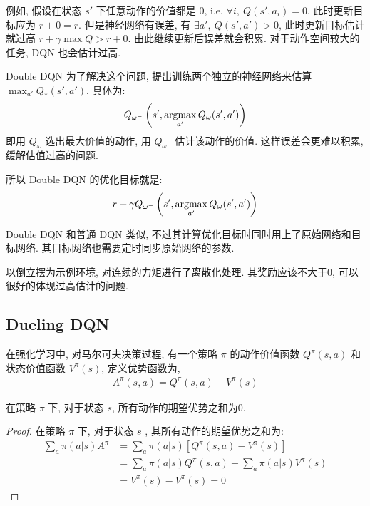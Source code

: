 例如, 假设在状态 $s'$ 下任意动作的价值都是 0, i.e.  $\forall i,\ Q(s', a_i)=0$, 此时更新目标应为 $r+0=r$. 但是神经网络有误差, 有 $\exists a',\ Q(s',a')>0$, 此时更新目标估计就过高 $r+\gamma \max Q > r+0$. 由此继续更新后误差就会积累. 对于动作空间较大的任务, DQN 也会估计过高. 

Double DQN 为了解决这个问题, 提出训练两个独立的神经网络来估算 $\max_{a'}Q_*(s',a')$. 具体为:
\begin{align*}
    Q_{\omega^-}\left( s', \operatorname*{argmax}_{a'} Q_{\omega} (s', a') \right)
\end{align*}
即用 $Q_{\omega}$ 选出最大价值的动作, 用 $ Q_{\omega^-}$ 估计该动作的价值. 这样误差会更难以积累, 缓解估值过高的问题. 

所以 Double DQN 的优化目标就是:
\begin{align*}
    r+ \gamma Q_{\omega^-}\left( s', \operatorname*{argmax}_{a'} Q_{\omega} (s', a') \right)
\end{align*}

Double DQN 和普通 DQN 类似, 不过其计算优化目标时同时用上了原始网络和目标网络. 其目标网络也需要定时同步原始网络的参数. 

以倒立摆为示例环境, 对连续的力矩进行了离散化处理. 其奖励应该不大于0, 可以很好的体现过高估计的问题. 

\subsection{Dueling DQN}

\begin{definition}
    在强化学习中, 对马尔可夫决策过程, 有一个策略 $\pi$ 的动作价值函数 $Q^\pi(s,a)$ 和 状态价值函数 $V^\pi(s)$, 定义优势函数为,
    \begin{align*}
        A^\pi(s,a) = Q^\pi(s,a) - V^\pi(s)
    \end{align*} 
\end{definition}

\begin{theorem}
    在策略 $\pi$ 下, 对于状态 $s$, 所有动作的期望优势之和为0.
\end{theorem}

\begin{proof}
    在策略 $\pi$ 下, 对于状态 $s$ , 其所有动作的期望优势之和为:
    \begin{align*}
        \sum_{a}\pi(a|s) A^\pi &= \sum_a \pi(a|s) \left[Q^\pi (s,a) - V^\pi(s)\right]\\
        &=\sum_a \pi(a|s) Q^\pi (s,a) - \sum_a \pi(a|s) V^\pi(s) \\
        &=   V^\pi(s)  -  V^\pi(s)  = 0
    \end{align*}
\end{proof}

